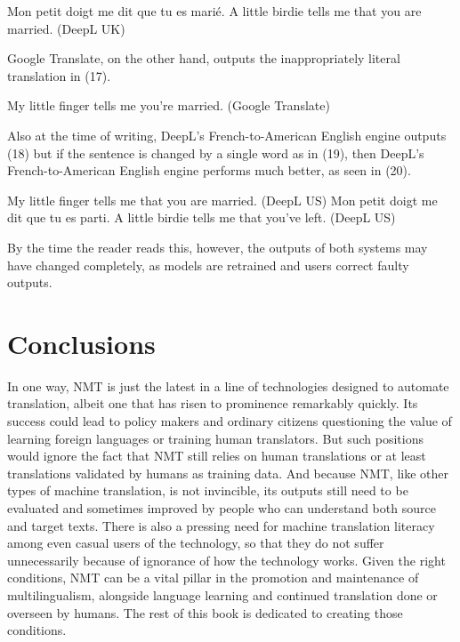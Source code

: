 \documentclass[output=paper]{langscibook}
\begin{document}
\ea Mon petit doigt me dit que tu es marié.
\ex A little birdie tells me that you are married. (DeepL UK)
\z

Google Translate, on the other hand, outputs the inappropriately literal translation in (17).

\ea
My little finger tells me you're married. (Google Translate)
\z

Also at the time of writing, DeepL's French-to-American English engine outputs (18) but if the sentence is changed by a single word as in (19), then DeepL's French-to-American English engine performs much better, as seen in (20).

\ea
My little finger tells me that you are married. (DeepL US)
\ex
Mon petit doigt me dit que tu es parti.
\ex
A little birdie tells me that you've left. (DeepL US)
\z


By the time the reader reads this, however, the outputs of both systems may have changed completely, as models are retrained and users correct faulty outputs.



\section{Conclusions}
In one way, NMT is just the latest in a line of technologies designed to automate translation, albeit one that has risen to prominence remarkably quickly. Its success could lead to policy makers and ordinary citizens questioning the value of learning foreign languages or training human translators. But such positions would ignore the fact that NMT still relies on human translations or at least translations validated by humans as training data. And because NMT, like other types of machine translation, is not invincible, its outputs still need to be evaluated and sometimes improved by people who can understand both source and target texts. There is also a pressing need for machine translation literacy among even casual users of the technology, so that they do not suffer unnecessarily because of ignorance of how the technology works. Given the right conditions, NMT can be a vital pillar in the promotion and maintenance of multilingualism, alongside language learning and continued translation done or overseen by humans. The rest of this book is dedicated to creating those conditions. 


\sloppy
\printbibliography[heading=subbibliography,notkeyword=this]
\end{document}

